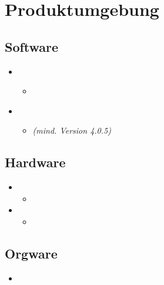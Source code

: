 \section{Produktumgebung}



\subsection{Software}

\begin{itemize}
  \item
    \begin{itemize}
      \item \textbf{}
    \end{itemize}
  \item
    \begin{itemize}
      \item \textbf{} \textit{(mind. Version 4.0.5)}
    \end{itemize}
\end{itemize}

\subsection{Hardware}

\begin{itemize}
  \item
    \begin{itemize}
      \item
    \end{itemize}
  \item
    \begin{itemize}
      \item
    \end{itemize}
\end{itemize}

\subsection{Orgware}

\begin{itemize}
  \item
\end{itemize}
